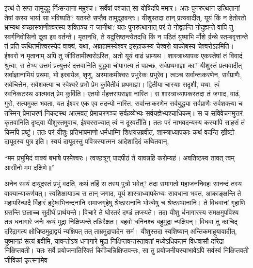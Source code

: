 \vakya इत्थं ते सप्त तामुदूहु र्निःसन्ताना मम्रुश्च। सर्वेषां पश्चात् सा योषिदपि ममार।
\vakya अतः पुनरुत्थान उत्थितानां तेषां कस्य भार्या सा भविष्यति? यतस्ते सप्तैव तामुदूढवन्तः।
\vakya यीशुस्तदा तान् प्रत्यवादीत्, यूयं किं न हेतोरतो भ्राम्यथ यच्छास्त्राणीश्वरस्य शक्तिञ्च न जानीथ?
\vakya यतः पुनरुत्थानात् परं ते नोद्वहन्ति नोदुह्यन्ते वापि तु स्वर्गनिवोसिनो दूता इव वर्तन्ते।
\vakya मृतानधि, ते यदुत्तिष्ठन्त्येतदधि किं न पठितं युष्माभि र्मोशे र्ग्रन्थे स्तम्बवृत्तान्ते तं प्रति कथितमीश्वरस्येदं वाक्यं, यथा, अब्राहामस्येश्वर इस्‌हाकस्य चेश्वरो याकोबस्य चेश्वरोऽहमिति।
\vakya ईश्वरो न मृतानाम् अपि तु जीवितामीश्वरोऽस्ति, अतो यूयं वाढं भ्राम्यथ।
\vakya शास्त्राध्यापक एकस्तेषां तं विवादं श्रुत्वा, स तेभ्य उत्तमं प्रत्युत्तरं दत्तवानिति बुद्ध्वा चोपागत्य तं पप्रच्छ, सर्वप्रथमाज्ञा का?
\vakya यीशुस्तं प्रत्यवादीत् सर्वाज्ञानामियं प्रथमा, भो इस्रायेल, शृणु, अस्माकमीश्वरः प्रभुरेकः प्रभुरेव।
\vakya त्वञ्च सर्वान्तःकरणेन, सर्वप्राणैः, सर्वचित्तेन, सर्वशक्त्या च स्वेश्वरे प्रभौ प्रेम कुर्वितीयं प्रथमाज्ञा।
\vakya द्वितीया चास्याः सदृशी, यथा, त्वं स्वनिकटस्थ आत्मवत् प्रेम कुर्विति। एतयो र्महत्तरापराज्ञा नास्ति।
\vakya स शास्त्राध्यापकस्तदा तं जगाद, वाढं, गुरो, सत्यमुक्त भवता, यत ईश्वर एक एव तदन्यो नास्ति,
\vakya सर्वान्तःकरणेन सर्वबुद्ध्या सर्वप्राणैः सर्वशक्त्या च तस्मिन् प्रेमाचरणं निकटस्थ आत्मवत् प्रेमाचरणञ्च सर्वहव्येभ्यः सर्वयज्ञेभ्यश्चाधिकम्।
\vakya स च सविवेचनमुत्तरं कृतवानिति दृष्ट्वा यीशुस्तमुवाच, ईश्वरराज्यात् त्वं न दूरवर्तीति। ततः परं नाभवदन्यस्य कस्यापि साहसं तं किमपि प्रष्टुं।
\vakya ततः परं यीशुः प्रतिभाषमाणो धर्मधाम्नि शिक्षयन्नब्रवीत्, शास्त्राध्यापकाः कथं वदन्ति ख्रीष्टो दायूदस्य पुत्र इति।
\vakya स्वयं दायूदस्तु पवित्रस्यात्मन आदेशादिदं कथितवान्,
\begin{poem}
\startwithline “मम प्रभुमिदं वाक्यं बभाषे परमेश्वरः।
\pline त्वच्छत्रून् पादपीठं ते यावन्नहि करोम्यहं।
\pline अवतिष्ठस्व तावत् त्वम् आसीनो मम दक्षिणे॥”
\end{poem}
\vakya अनेन स्वयं दायूदस्तं प्रभुं वदति, कथं तर्हि स तस्य पुत्रो भवेत्? तदा समागतो महाजननिवहः सानन्दं तस्य वाक्यान्याकर्णयत्।
\vakya स्वशिक्षायाञ्च स तान् जगाद, यूयं शास्त्राध्यापकेभ्यः सावधाना भवत, आकाङ्क्षन्ति ते महापरिच्छदै र्विहारं हट्टेष्वभिनन्दनानि समाजगृहेषु श्रेष्ठासनानि भोज्येषु च श्रेष्ठस्थानानि।
\vakya ते विधवानां गृहाणि ग्रसन्ति छलाच्च सुदीर्घं प्रार्थयन्ते।
\vakya विचारे ते घोरतरं दण्डं लप्स्यते।
\vakya तदा यीशु र्धनागारस्य समक्षमुपविश्य तत्र धनागारे जनैः कथं मुद्रा निक्षिप्यन्ते तन्निरैक्षत। बहवो धनिनश्च बहुमुद्रा न्यक्षिपन्।
\vakya विधवा तु काचिद् दरिद्रागत्य क्षोधिष्ठमुद्राद्वयं न्यक्षिपत् तत् ताम्रमुद्रापादेन समं।
\vakya यीशुस्तदा स्वशिष्यान् अन्तिकमाहूयावादीत्, युष्मानहं सत्यं ब्रवीमि, यावन्तोऽत्र धनागारे मुद्रा निक्षिप्तवन्तस्तावतां मध्येऽधिकतमं विधवासौ दरिद्रा निक्षिप्तवती।
\vakya यतः सर्वे प्रयोजनातिरिक्तं किञ्चिन्निक्षिप्तवन्तः, सा तु प्रयोजनीयस्याभावेऽपि सर्वस्वं निक्षिप्तवती जीविकां कृत्स्नामेव\eoc